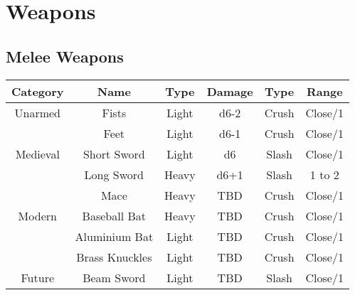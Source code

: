 
\section{Weapons} \label{sec:weapons}
\subsection{Melee Weapons}
\begin{center}
\begin{tabular}{c | c | c | c | c | c}
    \textbf{Category} & \textbf{Name} & \textbf{Type} & \textbf{Damage} & \textbf{Type} & \textbf{Range} \\\hline
    Unarmed  & Fists          & Light & d6-2  & Crush & Close/1\\
             & Feet           & Light & d6-1  & Crush & Close/1 \\\hline
    Medieval & Short Sword    & Light & d6    & Slash & Close/1 \\
             & Long Sword     & Heavy & d6+1  & Slash & 1 to 2 \\
             & Mace           & Heavy &  TBD  & Crush & Close/1\\\hline
    Modern   & Baseball Bat   & Heavy &  TBD  & Crush & Close/1\\
             & Aluminium Bat  & Light &  TBD  & Crush & Close/1\\
             & Brass Knuckles & Light &  TBD  & Crush & Close/1\\\hline
    Future   & Beam Sword     & Light &  TBD  & Slash & Close/1
\end{tabular}
\end{center}

